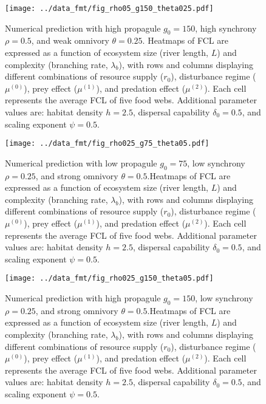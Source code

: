 \newpage

\begin{figure}
\centering
\texttt{[image: ../data\_fmt/fig\_rho05\_g150\_theta025.pdf]}
\caption{\label{fig:fig-num4}Numerical prediction with high propagule
\(g_0 = 150\), high synchrony \(\rho = 0.5\), and weak omnivory
\(\theta = 0.25\). Heatmaps of FCL are expressed as a function of
ecosystem size (river length, \(L\)) and complexity (branching rate,
\(\lambda_b\)), with rows and columns displaying different combinations
of resource supply (\(r_0\)), disturbance regime (\(\mu^{(0)}\)), prey
effect (\(\mu^{(1)}\)), and predation effect (\(\mu^{(2)}\)). Each cell
represents the average FCL of five food webs. Additional parameter
values are: habitat density \(h=2.5\), dispersal capability
\(\delta_0=0.5\), and scaling exponent \(\psi=0.5\).}
\end{figure}

\newpage

\begin{figure}
\centering
\texttt{[image: ../data\_fmt/fig\_rho025\_g75\_theta05.pdf]}
\caption{\label{fig:fig-num5}Numerical prediction with low propagule
\(g_0 = 75\), low synchrony \(\rho = 0.25\), and strong omnivory
\(\theta = 0.5\).Heatmaps of FCL are expressed as a function of
ecosystem size (river length, \(L\)) and complexity (branching rate,
\(\lambda_b\)), with rows and columns displaying different combinations
of resource supply (\(r_0\)), disturbance regime (\(\mu^{(0)}\)), prey
effect (\(\mu^{(1)}\)), and predation effect (\(\mu^{(2)}\)). Each cell
represents the average FCL of five food webs. Additional parameter
values are: habitat density \(h=2.5\), dispersal capability
\(\delta_0=0.5\), and scaling exponent \(\psi=0.5\).}
\end{figure}

\newpage

\begin{figure}
\centering
\texttt{[image: ../data\_fmt/fig\_rho025\_g150\_theta05.pdf]}
\caption{\label{fig:fig-num6}Numerical prediction with high propagule
\(g_0 = 150\), low synchrony \(\rho = 0.25\), and strong omnivory
\(\theta = 0.5\).Heatmaps of FCL are expressed as a function of
ecosystem size (river length, \(L\)) and complexity (branching rate,
\(\lambda_b\)), with rows and columns displaying different combinations
of resource supply (\(r_0\)), disturbance regime (\(\mu^{(0)}\)), prey
effect (\(\mu^{(1)}\)), and predation effect (\(\mu^{(2)}\)). Each cell
represents the average FCL of five food webs. Additional parameter
values are: habitat density \(h=2.5\), dispersal capability
\(\delta_0=0.5\), and scaling exponent \(\psi=0.5\).}
\end{figure}

